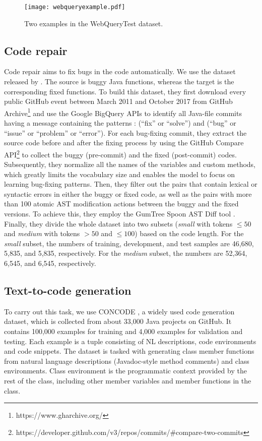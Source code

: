 \documentclass[sigconf,nonacm,screen]{acmart}
\begin{document}
\begin{figure}
    \texttt{[image: webqueryexample.pdf]}
    \caption{Two examples in the WebQueryTest dataset.}
    \label{fig:webqueryexample}
\end{figure}


\subsection{Code repair}
\label{code_repair}
Code repair aims to fix bugs in the code automatically. We use the dataset released by \citet{tufano2019empirical}. The source is buggy Java functions, whereas the target is the corresponding fixed functions. 
To build this dataset, they first download every public GitHub event between March 2011 and October 2017 from GitHub Archive\footnote{https://www.gharchive.org/} and use the Google BigQuery APIs to identify all Java-file commits having a message containing the patterns \cite{fischer2003populating}: (“fix” or “solve”) and (“bug” or “issue” or “problem” or “error”). For each bug-fixing commit, they extract the source code before and after the fixing process by using the GitHub Compare API\footnote{https://developer.github.com/v3/repos/commits/\#compare-two-commits} to collect the buggy (pre-commit) and the fixed (post-commit) codes. Subsequently, they normalize all the names of the variables and custom methods, which greatly limits the vocabulary size and enables the model to focus on learning bug-fixing patterns. Then, they filter out the pairs that contain lexical or syntactic errors in either the buggy or fixed code, as well as the pairs with more than 100 atomic AST modification actions between the buggy and the fixed versions.
To achieve this, they employ the GumTree Spoon AST Diff tool \cite{falleri2014fine}. 
Finally, they divide the whole dataset into two subsets (\textit{small} with tokens $\leq 50$ and \textit{medium} with tokens $> 50$ and $\leq 100$) based on the code length. For the \textit{small} subset, the numbers of training, development, and test samples are 46,680, 5,835, and 5,835, respectively. For the \textit{medium} subset, the numbers are 52,364, 6,545, and 6,545, respectively.

\subsection{Text-to-code generation}
To carry out this task, we use CONCODE \cite{iyer2018mapping}, a widely used code generation dataset, which is collected from about 33,000 Java projects on GitHub. It contains 100,000 examples for training and 4,000 examples for validation and testing. Each example is a tuple consisting of NL descriptions, code environments and code snippets. The dataset is tasked with generating class member functions from natural language descriptions (Javadoc-style method comments) and class environments. Class environment is the programmatic context provided by the rest of the class, including other member variables and member functions in the class. 
\end{document}
